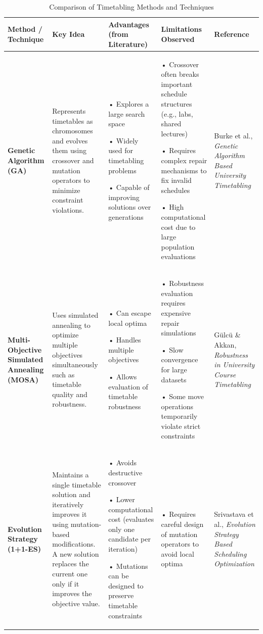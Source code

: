 \documentclass{article}
\begin{document}
\begin{table}[htbp]
    \centering
    \caption{Comparison of Timetabling Methods and Techniques}
    \vspace{2mm}
    \small %
    \begin{tabularx}{\textwidth}{|>{\RaggedRight\arraybackslash}p{2.5cm}|>{\RaggedRight\arraybackslash}X|>{\RaggedRight\arraybackslash}X|>{\RaggedRight\arraybackslash}X|>{\RaggedRight\arraybackslash}p{2.5cm}|}
        \hline
        \textbf{Method / Technique} & \textbf{Key Idea} & \textbf{Advantages (from Literature)} & \textbf{Limitations Observed} & \textbf{Reference} \\ \hline
        
        \textbf{Genetic Algorithm (GA)} & 
        Represents timetables as chromosomes and evolves them using crossover and mutation operators to minimize constraint violations. & 
        • Explores a large search space \par • Widely used for timetabling problems \par • Capable of improving solutions over generations & 
        • Crossover often breaks important schedule structures (e.g., labs, shared lectures) \par • Requires complex repair mechanisms to fix invalid schedules \par • High computational cost due to large population evaluations & 
        Burke et al., \textit{Genetic Algorithm Based University Timetabling} \\ \hline
        
        \textbf{Multi-Objective Simulated Annealing (MOSA)} & 
        Uses simulated annealing to optimize multiple objectives simultaneously such as timetable quality and robustness. & 
        • Can escape local optima \par • Handles multiple objectives \par • Allows evaluation of timetable robustness & 
        • Robustness evaluation requires expensive repair simulations \par • Slow convergence for large datasets \par • Some move operations temporarily violate strict constraints & 
        Gülcü \& Akkan, \textit{Robustness in University Course Timetabling} \\ \hline
        
        \textbf{Evolution Strategy (1+1-ES)} & 
        Maintains a single timetable solution and iteratively improves it using mutation-based modifications. A new solution replaces the current one only if it improves the objective value. & 
        • Avoids destructive crossover \par • Lower computational cost (evaluates only one candidate per iteration) \par • Mutations can be designed to preserve timetable constraints & 
        • Requires careful design of mutation operators to avoid local optima & 
        Srivastava et al., \textit{Evolution Strategy Based Scheduling Optimization} \\ \hline
        

\end{tabularx}
\end{table}
\end{document}
